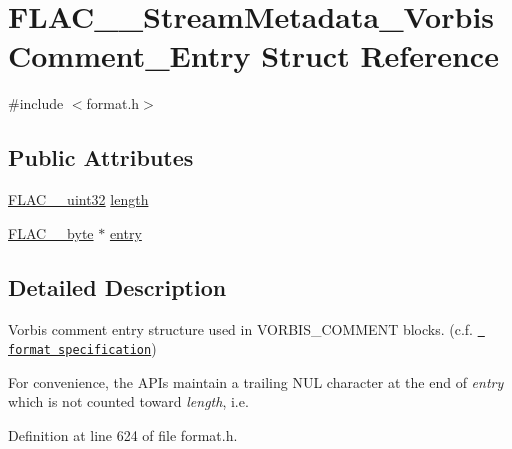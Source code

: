 \hypertarget{struct_f_l_a_c_____stream_metadata___vorbis_comment___entry}{}\section{F\+L\+A\+C\+\_\+\+\_\+\+Stream\+Metadata\+\_\+\+Vorbis\+Comment\+\_\+\+Entry Struct Reference}
\label{struct_f_l_a_c_____stream_metadata___vorbis_comment___entry}


{\ttfamily \#include $<$format.\+h$>$}

\subsection*{Public Attributes}
\begin{DoxyCompactItemize}
\item 
\mbox{\hyperlink{ordinals_8h_a9c4005ea7ef8d564b0cc993cdd0e4e5e}{F\+L\+A\+C\+\_\+\+\_\+uint32}} \mbox{\hyperlink{struct_f_l_a_c_____stream_metadata___vorbis_comment___entry_aa375f16819aaa4f7e08d8009167cb19e}{length}}
\item 
\mbox{\hyperlink{ordinals_8h_a5eb569b12d5b047cdacada4d57924ee3}{F\+L\+A\+C\+\_\+\+\_\+byte}} $\ast$ \mbox{\hyperlink{struct_f_l_a_c_____stream_metadata___vorbis_comment___entry_a78944f78822b92e7a4e5f15f118f6132}{entry}}
\end{DoxyCompactItemize}


\subsection{Detailed Description}
Vorbis comment entry structure used in V\+O\+R\+B\+I\+S\+\_\+\+C\+O\+M\+M\+E\+NT blocks. (c.\+f. \href{../format.html\#metadata_block_vorbis_comment}{\texttt{ format specification}})

For convenience, the A\+P\+Is maintain a trailing N\+UL character at the end of {\itshape entry} which is not counted toward {\itshape length}, i.\+e. 
\begin{DoxyCode}{0}
\end{DoxyCode}
 

Definition at line 624 of file format.\+h.



